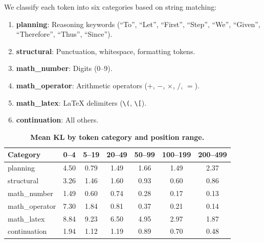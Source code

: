 \documentclass{article}
\begin{document}
We classify each token into six categories based on string matching:
\begin{enumerate}
    \item \textbf{planning}: Reasoning keywords (``To'', ``Let'', ``First'', ``Step'', ``We'', ``Given'', ``Therefore'', ``Thus'', ``Since'').
    \item \textbf{structural}: Punctuation, whitespace, formatting tokens.
    \item \textbf{math\_number}: Digits (0--9).
    \item \textbf{math\_operator}: Arithmetic operators ($+$, $-$, $\times$, $/$, $=$).
    \item \textbf{math\_latex}: LaTeX delimiters (\texttt{\textbackslash(}, \texttt{\textbackslash[}).
    \item \textbf{continuation}: All others.
\end{enumerate}

\begin{table}[!htbp]
\centering
\caption{\textbf{Mean KL by token category and position range.}}
\label{tab:app_kl_by_category}
\small
\begin{tabular}{lcccccc}
\toprule
\textbf{Category} & \textbf{0--4} & \textbf{5--19} & \textbf{20--49} & \textbf{50--99} & \textbf{100--199} & \textbf{200--499} \\
\midrule
planning & 4.50 & 0.79 & 1.49 & 1.66 & 1.49 & 2.37 \\
structural & 3.26 & 1.46 & 1.60 & 0.93 & 0.60 & 0.86 \\
math\_number & 1.49 & 0.60 & 0.74 & 0.28 & 0.17 & 0.13 \\
math\_operator & 7.30 & 1.84 & 0.81 & 0.37 & 0.21 & 0.14 \\
math\_latex & 8.84 & 9.23 & 6.50 & 4.95 & 2.97 & 1.87 \\
continuation & 1.94 & 1.12 & 1.19 & 0.89 & 0.70 & 0.48 \\
\bottomrule
\end{tabular}
\end{table}
\end{document}
